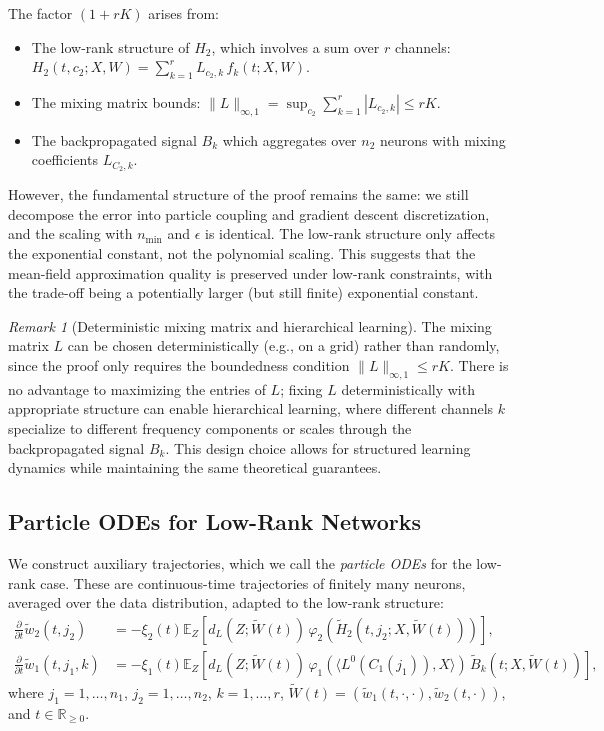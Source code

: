 \documentclass[nohyperref]{article}
\theoremstyle{plain}
\theoremstyle{definition}
\theoremstyle{remark}
\newtheorem{remark}[theorem]{Remark}
\begin{document}
The factor $(1+rK)$ arises from:
\begin{itemize}
\item The low-rank structure of $H_2$, which involves a sum over $r$ channels: $H_2(t, c_2; X, W) = \sum_{k=1}^r L_{c_2,k}\,f_k(t; X, W)$.
\item The mixing matrix bounds: $\|L\|_{\infty,1} = \sup_{c_2}\sum_{k=1}^r |L_{c_2,k}| \le rK$.
\item The backpropagated signal $B_k$ which aggregates over $n_2$ neurons with mixing coefficients $L_{C_2,k}$.
\end{itemize}

However, the fundamental structure of the proof remains the same: we still decompose the error into particle coupling and gradient descent discretization, and the scaling with $n_{\min}$ and $\epsilon$ is identical. The low-rank structure only affects the exponential constant, not the polynomial scaling. This suggests that the mean-field approximation quality is preserved under low-rank constraints, with the trade-off being a potentially larger (but still finite) exponential constant.

\begin{remark}[Deterministic mixing matrix and hierarchical learning]
\label{rem:deterministic-L}
The mixing matrix $L$ can be chosen deterministically (e.g., on a grid) rather than randomly, since the proof only requires the boundedness condition $\|L\|_{\infty,1} \le rK$. There is no advantage to maximizing the entries of $L$; fixing $L$ deterministically with appropriate structure can enable hierarchical learning, where different channels $k$ specialize to different frequency components or scales through the backpropagated signal $B_k$. This design choice allows for structured learning dynamics while maintaining the same theoretical guarantees.
\end{remark}

\subsection{Particle ODEs for Low-Rank Networks}

We construct auxiliary trajectories, which we call the \textit{particle ODEs} for the low-rank case. These are continuous-time trajectories of finitely many neurons, averaged over the data distribution, adapted to the low-rank structure:
\begin{align*}
\frac{\partial}{\partial t}\tilde{w}_2(t, j_2) &= -\xi_2(t)\mathbb{E}_Z\left[d_L(Z; \tilde{W}(t))\,\varphi_2(\tilde{H}_2(t, j_2; X, \tilde{W}(t)))\right],\\
\frac{\partial}{\partial t}\tilde{w}_1(t, j_1, k) &= -\xi_1(t)\mathbb{E}_Z\left[d_L(Z; \tilde{W}(t))\,\varphi_1(\langle L^0(C_1(j_1)), X\rangle)\,\tilde{B}_k(t; X, \tilde{W}(t))\right],
\end{align*}
where $j_1 = 1, \ldots, n_1$, $j_2 = 1, \ldots, n_2$, $k = 1, \ldots, r$, $\tilde{W}(t) = (\tilde{w}_1(t, \cdot, \cdot), \tilde{w}_2(t, \cdot))$, and $t \in \mathbb{R}_{\ge 0}$. 
\end{document}
